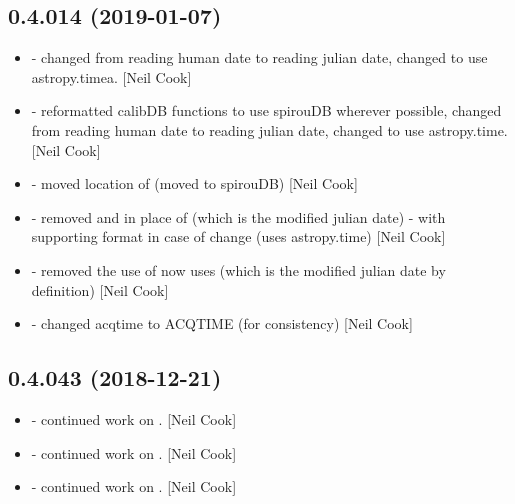 \documentclass[a4paper,10pt,english]{report}
\begin{document}
\subsection{0.4.014 (2019-01-07)}
\label{\detokenize{misc/changelog:id222}}\begin{itemize}
\item {} 
 - changed from reading human date to reading julian date,
changed to use astropy.timea. {[}Neil Cook{]}

\item {} 
 - reformatted calibDB functions to use spirouDB wherever
possible, changed from reading human date to reading julian date,
changed to use astropy.time. {[}Neil Cook{]}

\item {} 
 - moved location of  (moved to
spirouDB) {[}Neil Cook{]}

\item {} 
 - removed  and  in
place of  (which is the modified julian date) - with
supporting format in case of change (uses astropy.time) {[}Neil Cook{]}

\item {} 
 - removed the use of  now uses
 (which is the modified julian date by definition) {[}Neil
Cook{]}

\item {} 
 - changed acqtime to ACQTIME (for
consistency) {[}Neil Cook{]}

\end{itemize}


\subsection{0.4.043 (2018-12-21)}
\label{\detokenize{misc/changelog:id223}}\begin{itemize}
\item {} 
 - continued work on . {[}Neil Cook{]}

\item {} 
 - continued work on . {[}Neil Cook{]}

\item {} 
 - continued work on . {[}Neil Cook{]}

\end{itemize}
\end{document}
